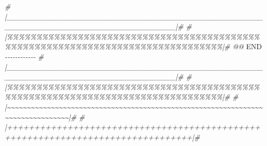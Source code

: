\documentclass[
]{article}
\newenvironment{Shaded}{\begin{snugshade}}{\end{snugshade}}
\newcommand{\CommentTok}[1]{\textcolor[rgb]{0.56,0.35,0.01}{\textit{#1}}}
\newcommand{\RegionMarkerTok}[1]{#1}
\begin{document}
\begin{Shaded}
\begin{Highlighting}[]
\CommentTok{\# |\_\_\_\_\_\_\_\_\_\_\_\_\_\_\_\_\_\_\_\_\_\_\_\_\_\_\_\_\_\_\_\_\_\_\_\_\_\_\_\_\_\_\_\_\_\_\_\_\_\_\_\_\_\_\_\_\_\_\_\_\_\_\_\_\_\_\_\_\_\_\_\_\_\_\_\_\_\_\_\_|\#}
\CommentTok{\# |\%\%\%\%\%\%\%\%\%\%\%\%\%\%\%\%\%\%\%\%\%\%\%\%\%\%\%\%\%\%\%\%\%\%\%\%\%\%\%\%\%\%\%\%\%\%\%\%\%\%\%\%\%\%\%\%\%\%\%\%\%\%\%\%\%\%\%\%\%\%\%\%\%\%\%\%\%\%\%\%|\# @@ }\RegionMarkerTok{END}\CommentTok{ {-}{-}{-}{-}{-}{-}{-}{-}{-}{-}{-}{-}}
\CommentTok{\# |\_\_\_\_\_\_\_\_\_\_\_\_\_\_\_\_\_\_\_\_\_\_\_\_\_\_\_\_\_\_\_\_\_\_\_\_\_\_\_\_\_\_\_\_\_\_\_\_\_\_\_\_\_\_\_\_\_\_\_\_\_\_\_\_\_\_\_\_\_\_\_\_\_\_\_\_\_\_\_\_|\#}
\CommentTok{\# |\%\%\%\%\%\%\%\%\%\%\%\%\%\%\%\%\%\%\%\%\%\%\%\%\%\%\%\%\%\%\%\%\%\%\%\%\%\%\%\%\%\%\%\%\%\%\%\%\%\%\%\%\%\%\%\%\%\%\%\%\%\%\%\%\%\%\%\%\%\%\%\%\%\%\%\%\%\%\%\%|\#}
\CommentTok{\# |\textasciitilde{}\textasciitilde{}\textasciitilde{}\textasciitilde{}\textasciitilde{}\textasciitilde{}\textasciitilde{}\textasciitilde{}\textasciitilde{}\textasciitilde{}\textasciitilde{}\textasciitilde{}\textasciitilde{}\textasciitilde{}\textasciitilde{}\textasciitilde{}\textasciitilde{}\textasciitilde{}\textasciitilde{}\textasciitilde{}\textasciitilde{}\textasciitilde{}\textasciitilde{}\textasciitilde{}\textasciitilde{}\textasciitilde{}\textasciitilde{}\textasciitilde{}\textasciitilde{}\textasciitilde{}\textasciitilde{}\textasciitilde{}\textasciitilde{}\textasciitilde{}\textasciitilde{}\textasciitilde{}\textasciitilde{}\textasciitilde{}\textasciitilde{}\textasciitilde{}\textasciitilde{}\textasciitilde{}\textasciitilde{}\textasciitilde{}\textasciitilde{}\textasciitilde{}\textasciitilde{}\textasciitilde{}\textasciitilde{}\textasciitilde{}\textasciitilde{}\textasciitilde{}\textasciitilde{}\textasciitilde{}\textasciitilde{}\textasciitilde{}\textasciitilde{}\textasciitilde{}\textasciitilde{}\textasciitilde{}\textasciitilde{}\textasciitilde{}\textasciitilde{}\textasciitilde{}\textasciitilde{}\textasciitilde{}\textasciitilde{}\textasciitilde{}\textasciitilde{}\textasciitilde{}\textasciitilde{}\textasciitilde{}\textasciitilde{}\textasciitilde{}\textasciitilde{}\textasciitilde{}\textasciitilde{}\textasciitilde{}\textasciitilde{}\textasciitilde{}|\#}
\CommentTok{\# |++++++++++++++++++++++++++++++++++++++++++++++++++++++++++++++++++++++++++++++++|\#}

\end{Highlighting}
\end{Shaded}
\end{document}
